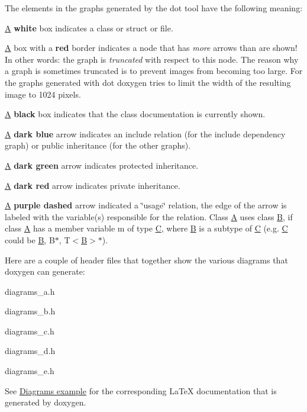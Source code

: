 The elements in the graphs generated by the dot tool have the following meaning\+: 
\begin{DoxyItemize}
\item \mbox{\hyperlink{class_a}{A}} {\bfseries{white}} box indicates a class or struct or file. 
\item \mbox{\hyperlink{class_a}{A}} box with a {\bfseries{red}} border indicates a node that has {\itshape more} arrows than are shown! In other words\+: the graph is {\itshape truncated} with respect to this node. The reason why a graph is sometimes truncated is to prevent images from becoming too large. For the graphs generated with dot doxygen tries to limit the width of the resulting image to 1024 pixels. ~\newline
 
\item \mbox{\hyperlink{class_a}{A}} {\bfseries{black}} box indicates that the class\textquotesingle{} documentation is currently shown. 
\item \mbox{\hyperlink{class_a}{A}} {\bfseries{dark blue}} arrow indicates an include relation (for the include dependency graph) or public inheritance (for the other graphs). 
\item \mbox{\hyperlink{class_a}{A}} {\bfseries{dark green}} arrow indicates protected inheritance. 
\item \mbox{\hyperlink{class_a}{A}} {\bfseries{dark red}} arrow indicates private inheritance. 
\item \mbox{\hyperlink{class_a}{A}} {\bfseries{purple dashed}} arrow indicated a \char`\"{}usage\char`\"{} relation, the edge of the arrow is labeled with the variable(s) responsible for the relation. Class {\ttfamily \mbox{\hyperlink{class_a}{A}}} uses class {\ttfamily \mbox{\hyperlink{class_b}{B}}}, if class {\ttfamily \mbox{\hyperlink{class_a}{A}}} has a member variable {\ttfamily m} of type \mbox{\hyperlink{class_c}{C}}, where \mbox{\hyperlink{class_b}{B}} is a subtype of \mbox{\hyperlink{class_c}{C}} (e.\+g. {\ttfamily \mbox{\hyperlink{class_c}{C}}} could be {\ttfamily \mbox{\hyperlink{class_b}{B}}}, {\ttfamily B$\ast$}, {\ttfamily T$<$\mbox{\hyperlink{class_b}{B}}$>$$\ast$}). 
\end{DoxyItemize}

Here are a couple of header files that together show the various diagrams that doxygen can generate\+:

{\ttfamily diagrams\+\_\+a.\+h} 
\begin{DoxyCodeInclude}{0}
\end{DoxyCodeInclude}
 {\ttfamily diagrams\+\_\+b.\+h} 
\begin{DoxyCodeInclude}{0}
\end{DoxyCodeInclude}
 {\ttfamily diagrams\+\_\+c.\+h} 
\begin{DoxyCodeInclude}{0}
\end{DoxyCodeInclude}
 {\ttfamily diagrams\+\_\+d.\+h} 
\begin{DoxyCodeInclude}{0}
\end{DoxyCodeInclude}
 {\ttfamily diagrams\+\_\+e.\+h} 
\begin{DoxyCodeInclude}{0}
\end{DoxyCodeInclude}


  
{
See \hyperlink{diagrams_example}{Diagrams example}
for the corresponding \mbox{\LaTeX} documentation that is generated by doxygen.
} {}


 